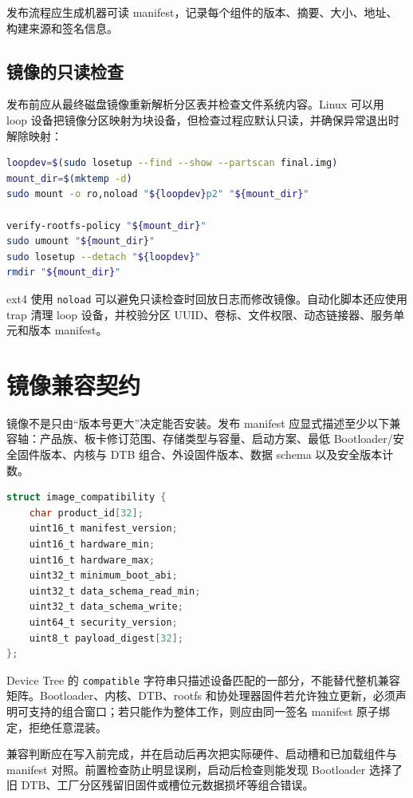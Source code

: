 发布流程应生成机器可读 manifest，记录每个组件的版本、摘要、大小、地址、构建来源和签名信息。

\subsection{镜像的只读检查}

发布前应从最终磁盘镜像重新解析分区表并检查文件系统内容。Linux 可以用 loop 设备把镜像分区映射为块设备，但检查过程应默认只读，并确保异常退出时解除映射：

\begin{lstlisting}[language=bash,caption={磁盘镜像的只读挂载检查}]
loopdev=$(sudo losetup --find --show --partscan final.img)
mount_dir=$(mktemp -d)
sudo mount -o ro,noload "${loopdev}p2" "${mount_dir}"

verify-rootfs-policy "${mount_dir}"
sudo umount "${mount_dir}"
sudo losetup --detach "${loopdev}"
rmdir "${mount_dir}"
\end{lstlisting}

ext4 使用 \texttt{noload} 可以避免只读检查时回放日志而修改镜像。自动化脚本还应使用 trap 清理 loop 设备，并校验分区 UUID、卷标、文件权限、动态链接器、服务单元和版本 manifest。

\section{镜像兼容契约}

镜像不是只由“版本号更大”决定能否安装。发布 manifest 应显式描述至少以下兼容轴：产品族、板卡修订范围、存储类型与容量、启动方案、最低 Bootloader/安全固件版本、内核与 DTB 组合、外设固件版本、数据 schema 以及安全版本计数。

\begin{lstlisting}[language=C,caption={镜像兼容清单的逻辑字段}]
struct image_compatibility {
    char product_id[32];
    uint16_t manifest_version;
    uint16_t hardware_min;
    uint16_t hardware_max;
    uint32_t minimum_boot_abi;
    uint32_t data_schema_read_min;
    uint32_t data_schema_write;
    uint64_t security_version;
    uint8_t payload_digest[32];
};
\end{lstlisting}

Device Tree 的 \texttt{compatible} 字符串只描述设备匹配的一部分，不能替代整机兼容矩阵。Bootloader、内核、DTB、rootfs 和协处理器固件若允许独立更新，必须声明可支持的组合窗口；若只能作为整体工作，则应由同一签名 manifest 原子绑定，拒绝任意混装。

兼容判断应在写入前完成，并在启动后再次把实际硬件、启动槽和已加载组件与 manifest 对照。前置检查防止明显误刷，启动后检查则能发现 Bootloader 选择了旧 DTB、工厂分区残留旧固件或槽位元数据损坏等组合错误。

